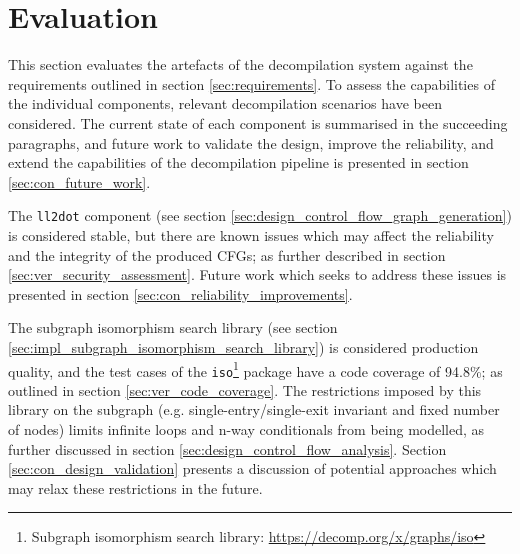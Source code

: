 
%

%
%

\section{Evaluation}
\label{sec:evaluation}

This section evaluates the artefacts of the decompilation system against the requirements outlined in section \ref{sec:requirements}. To assess the capabilities of the individual components, relevant decompilation scenarios have been considered. The current state of each component is summarised in the succeeding paragraphs, and future work to validate the design, improve the reliability, and extend the capabilities of the decompilation pipeline is presented in section \ref{sec:con_future_work}.

The \texttt{ll2dot} component (see section \ref{sec:design_control_flow_graph_generation}) is considered stable, but there are known issues which may affect the reliability and the integrity of the produced CFGs; as further described in section \ref{sec:ver_security_assessment}. Future work which seeks to address these issues is presented in section \ref{sec:con_reliability_improvements}.

The subgraph isomorphism search library (see section \ref{sec:impl_subgraph_isomorphism_search_library}) is considered production quality, and the test cases of the \texttt{iso}\footnote{Subgraph isomorphism search library: \url{https://decomp.org/x/graphs/iso}} package have a code coverage of 94.8\%; as outlined in section \ref{sec:ver_code_coverage}. The restrictions imposed by this library on the subgraph (e.g. single-entry/single-exit invariant and fixed number of nodes) limits infinite loops and n-way conditionals from being modelled, as further discussed in section \ref{sec:design_control_flow_analysis}. Section \ref{sec:con_design_validation} presents a discussion of potential approaches which may relax these restrictions in the future.

